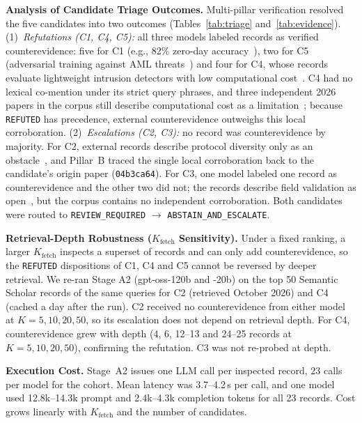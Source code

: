 \documentclass[runningheads]{llncs}
\begin{document}
\noindent\textbf{Analysis of Candidate Triage Outcomes.} Multi-pillar verification resolved the five candidates into two outcomes (Tables~\ref{tab:triage} and~\ref{tab:evidence}).
(1)~\emph{Refutations (C1, C4, C5):} all three models labeled records as verified counterevidence: five for C1 (e.g., 82\% zero-day accuracy~\cite{nitrat2025zeroday}), two for C5 (adversarial training against AML threats~\cite{nguyen2025adversarial}) and four for C4, whose records evaluate lightweight intrusion detectors with low computational cost~\cite{kamruzzaman2025lightweight}. C4 had no lexical co-mention under its strict query phrases, and three independent 2026 papers in the corpus still describe computational cost as a limitation~\cite{jenish2026review,alam2026reservoir,mahdi2026scf}; because \texttt{REFUTED} has precedence, external counterevidence outweighs this local corroboration.
(2)~\emph{Escalations (C2, C3):} no record was counterevidence by majority. For C2, external records describe protocol diversity only as an obstacle~\cite{shukla2025effective}, and Pillar~B traced the single local corroboration back to the candidate's origin paper (\texttt{04b3ca64}). For C3, one model labeled one record as counterevidence and the other two did not; the records describe field validation as open~\cite{tsallis2026industrial}, but the corpus contains no independent corroboration. Both candidates were routed to \texttt{REVIEW\_REQUIRED} $\rightarrow$ \texttt{ABSTAIN\_AND\_ESCALATE}.

\noindent\textbf{Retrieval-Depth Robustness ($K_{\text{fetch}}$ Sensitivity).} Under a fixed ranking, a larger $K_{\text{fetch}}$ inspects a superset of records and can only add counterevidence, so the \texttt{REFUTED} dispositions of C1, C4 and C5 cannot be reversed by deeper retrieval. We re-ran Stage A2 (gpt-oss-120b and -20b) on the top 50 Semantic Scholar records of the same queries for C2 (retrieved October 2026) and C4 (cached a day after the run). C2 received no counterevidence from either model at $K = 5, 10, 20, 50$, so its escalation does not depend on retrieval depth. For C4, counterevidence grew with depth (4, 6, 12--13 and 24--25 records at $K = 5, 10, 20, 50$), confirming the refutation. C3 was not re-probed at depth.

\noindent\textbf{Execution Cost.} Stage~A2 issues one LLM call per inspected record, 23 calls per model for the cohort. Mean latency was 3.7--4.2\,s per call, and one model used 12.8k--14.3k prompt and 2.4k--4.3k completion tokens for all 23 records. Cost grows linearly with $K_{\text{fetch}}$ and the number of candidates.
\end{document}
